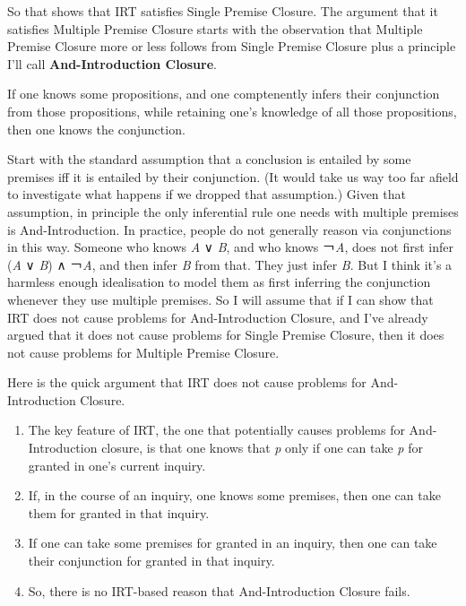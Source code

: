 \documentclass[
  11pt,
]{book}
\providecommand{\tightlist}{%
  \setlength{\itemsep}{0pt}\setlength{\parskip}{0pt}}
\begin{document}
So that shows that IRT satisfies Single Premise Closure. The argument that it satisfies Multiple Premise Closure starts with the observation that Multiple Premise Closure more or less follows from Single Premise Closure plus a principle I'll call \textbf{And-Introduction Closure}.

\begin{description}
\tightlist
\item[And-Introduction Closure]
If one knows some propositions, and one comptenently infers their conjunction from those propositions, while retaining one's knowledge of all those propositions, then one knows the conjunction.
\end{description}

Start with the standard assumption that a conclusion is entailed by some premises iff it is entailed by their conjunction. (It would take us way too far afield to investigate what happens if we dropped that assumption.) Given that assumption, in principle the only inferential rule one needs with multiple premises is And-Introduction. In practice, people do not generally reason via conjunctions in this way. Someone who knows \emph{A} ∨ \emph{B}, and who knows ￢\emph{A}, does not first infer (\emph{A} ∨ \emph{B}) ∧ ￢\emph{A}, and then infer \emph{B} from that. They just infer \emph{B}. But I think it's a harmless enough idealisation to model them as first inferring the conjunction whenever they use multiple premises. So I will assume that if I can show that IRT does not cause problems for And-Introduction Closure, and I've already argued that it does not cause problems for Single Premise Closure, then it does not cause problems for Multiple Premise Closure.

Here is the quick argument that IRT does not cause problems for And-Introduction Closure.

\begin{enumerate}
\def\labelenumi{\arabic{enumi}.}
\tightlist
\item
  The key feature of IRT, the one that potentially causes problems for And-Introduction closure, is that one knows that \emph{p} only if one can take \emph{p} for granted in one's current inquiry.
\item
  If, in the course of an inquiry, one knows some premises, then one can take them for granted in that inquiry.
\item
  If one can take some premises for granted in an inquiry, then one can take their conjunction for granted in that inquiry.
\item
  So, there is no IRT-based reason that And-Introduction Closure fails.
\end{enumerate}
\end{document}
